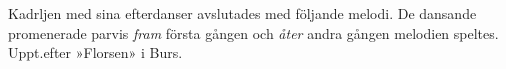 Kadrljen med sina efterdanser avslutades med följande melodi.
De dansande promenerade parvis \textit{fram} första gången och
\textit{åter} andra gången melodien speltes. Uppt.\@ efter »Florsen» i Burs.